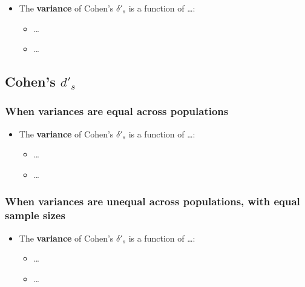 \documentclass[
  man]{apa6}
\providecommand{\tightlist}{%
  \setlength{\itemsep}{0pt}\setlength{\parskip}{0pt}}
\begin{document}
\begin{itemize}
\tightlist
\item
  The \textbf{variance} of Cohen's \(\delta'_s\) is a function of \ldots:

  \begin{itemize}
  \tightlist
  \item
    \ldots{}
  \item
    \ldots{}
  \end{itemize}
\end{itemize}

\hypertarget{cohens-d_s-3}{%
\subsection{\texorpdfstring{Cohen's \(d'_s\)}{Cohen's d'\_s}}\label{cohens-d_s-3}}

\hypertarget{when-variances-are-equal-across-populations-5}{%
\subsubsection{When variances are equal across populations}\label{when-variances-are-equal-across-populations-5}}

\begin{itemize}
\tightlist
\item
  The \textbf{variance} of Cohen's \(\delta'_s\) is a function of \ldots:

  \begin{itemize}
  \tightlist
  \item
    \ldots{}
  \item
    \ldots{}
  \end{itemize}
\end{itemize}

\hypertarget{when-variances-are-unequal-across-populations-with-equal-sample-sizes-3}{%
\subsubsection{When variances are unequal across populations, with equal sample sizes}\label{when-variances-are-unequal-across-populations-with-equal-sample-sizes-3}}

\begin{itemize}
\tightlist
\item
  The \textbf{variance} of Cohen's \(\delta'_s\) is a function of \ldots:

  \begin{itemize}
  \tightlist
  \item
    \ldots{}
  \item
    \ldots{}
  \end{itemize}
\end{itemize}
\end{document}
